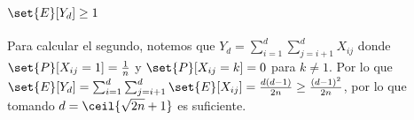 \documentclass{ayudantia}
\begin{document}
\section*{\(\set{E}[Y_d]\geq1\)}
Para calcular el segundo, notemos que \(Y_d=\sum_{i=1}^d\sum_{j=i+1}^dX_{ij}\) donde \(\set{P}[X_{ij}=1]=\frac1n\) y \(\set{P}[X_{ij}=k]=0\) para \(k\neq1\). Por lo que \(\set{E}[Y_d]=\sum_{i=1}^d\sum_{j=i+1}^d\set{E}[X_{ij}]=\frac{d(d-1)}{2n}\geq\frac{(d-1)^2}{2n}\), por lo que tomando \(d=\ceil{\sqrt{2n}+1}\) es suficiente.
\end{document}
